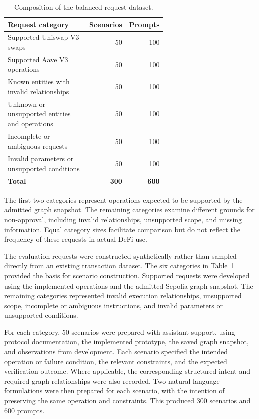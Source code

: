 \begin{table}[htbp]
    \centering
    \small
    \caption{Composition of the balanced request dataset.}
    \label{tab:evaluation_dataset}
    \begin{tabular}{p{0.63\linewidth}rr}
        \hline
        \textbf{Request category} & \textbf{Scenarios} & \textbf{Prompts} \\
        \hline
        Supported Uniswap V3 swaps & 50 & 100 \\
        Supported Aave V3 operations & 50 & 100 \\
        Known entities with invalid relationships & 50 & 100 \\
        Unknown or unsupported entities and operations & 50 & 100 \\
        Incomplete or ambiguous requests & 50 & 100 \\
        Invalid parameters or unsupported conditions & 50 & 100 \\
        \hline
        \textbf{Total} & \textbf{300} & \textbf{600} \\
        \hline
    \end{tabular}
\end{table}

The first two categories represent operations expected to be supported by the
admitted graph snapshot. The remaining categories examine different grounds
for non-approval, including invalid relationships, unsupported scope, and
missing information. Equal category sizes facilitate comparison but do not
reflect the frequency of these requests in actual DeFi use. 


The evaluation requests were constructed synthetically rather than
sampled directly from an existing transaction dataset. The six
categories in Table~\ref{tab:evaluation_dataset} provided the basis
for scenario construction. Supported requests were developed using
the implemented operations and the admitted Sepolia graph snapshot.
The remaining categories represented invalid execution relationships,
unsupported scope, incomplete or ambiguous instructions, and
invalid parameters or unsupported conditions.

For each category, 50 scenarios were prepared with assistant support,
using protocol documentation, the implemented prototype, the saved
graph snapshot, and observations from development. Each scenario
specified the intended operation or failure condition, the relevant
constraints, and the expected verification outcome. Where applicable,
the corresponding structured intent and required graph relationships
were also recorded. Two natural-language formulations were then
prepared for each scenario, with the intention of preserving the same
operation and constraints. This produced 300 scenarios and 600 prompts.

